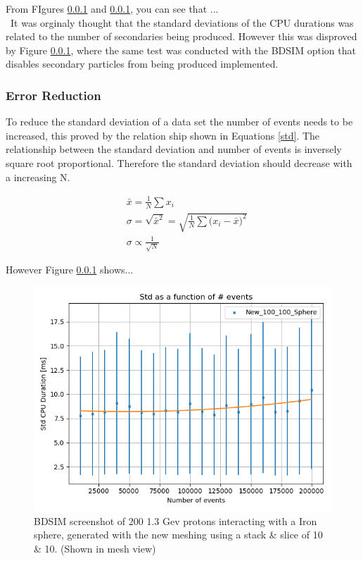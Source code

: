 \documentclass[12pt,a4paper]{article}
\begin{document}
\noindent From FIgures \ref{} and \ref{}, you can see that ...
\\\
\noindent It was orginaly thought that the standard deviations of the CPU durations was related to the number of secondaries being produced. However this was disproved by Figure \ref{}, where the same test was conducted with the BDSIM option that disables secondary particles from being produced implemented.

\subsubsection{Error Reduction}
To reduce the standard deviation of a data set the number of events needs to be increased, this proved by the relation ship shown in Equations \ref{std}. The relationship between the standard deviation and number of events is inversely square root proportional. Therefore the standard deviation should decrease with a increasing N.

\begin{equation}
\begin{aligned}
& \bar{x} = \frac{1}{N}\sum{x_i}\\
& \sigma = \sqrt{\bar{x}^2} = \sqrt{\frac{1}{N}\sum{(x_i - \bar{x}})^2}\\
& \sigma \propto \frac{1}{\sqrt{N}} 
\end{aligned}
\label{std}
\end{equation}

However Figure \ref{} shows...\\
\begin{figure}[h!]
\centering
\includegraphics[scale=0.5]{Images//Error//std_N.png}
\caption[width=\columnwidth]{BDSIM screenshot of 200 1.3 Gev protons interacting with a Iron sphere, generated with the new meshing using a stack \& slice of 10 \& 10. (Shown in mesh view)}
\label{sphbd}
\end{figure}
\end{document}
